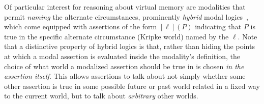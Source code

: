
Of particular interest for reasoning about virtual memory are modalities that permit \emph{naming} the alternate 
circumstances, prominently \emph{hybrid} modal logics~\cite{blackburn1995hybrid,areces2001hybrid}, which come equipped 
with assertions of the form $[\ell](P)$ indicating that $P$ is true in the specific alternate circumstance (Kripke world)
 named by the  $\ell$. Note that a distinctive property of hybrid logics is that, rather than hiding
the points at which a modal assertion is evaluated inside the modality's definition, the choice of what world a modalized
assertion should be true in is chosen \emph{in the assertion itself}. This allows assertions to talk about not simply whether some other assertion
is true in some possible future or past world related in a fixed way to the current world, but to talk about \emph{arbitrary}
other worlds.

